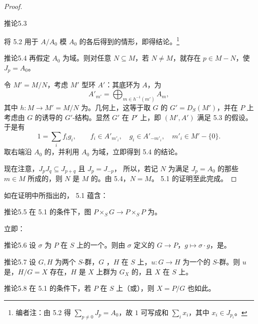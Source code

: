 \begin{proof}
\begin{SGAresult}{推论}{5.3}
\end{SGAresult}
将 5.2 用于 $A/A_0$ 模 $A_0$ 的各后得到的情形，即得结论。\footnote[20]{编者注：由 5.2 得 $\sum_{p\ne0}J_p=A_0$，故 $1$ 可写成和 $\sum_i x_i$，其中 $x_i\in J_{p_i}$。}
\begin{SGAresult}{推论}{5.4}
再假定 $A_0$ 为域。则对任意 $N\subseteq M$，若 $N\ne M$，就存在 $p\in M-N$，使 $J_p=A_0$。
\end{SGAresult}
令 $M'=M/N$，考虑 $M'$ 型环 $A'$：其底环为 $A$，为
\[
A'_{m'}=\bigoplus_{m\in h^{-1}(m')}A_m,
\]
其中 $h:M\to M'=M/N$ 为。几何上，这等于取 $G$ 的 $G'=D_S(M')$，并在 $P$ 上考虑由 $G$ 的诱导的 $G'$-结构。显然 $G'$ 在 $P'$ 上，即 $(M',A')$ 满足 5.3 的假设。于是有
\[
1=\sum_i f_ig_i,\qquad f_i\in A'_{m'_i},\quad g_i\in A'_{-m'_i},\quad m'_i\in M'-\{0\}.
\]
取右端沿 $A_0$ 的，并利用 $A_0$ 为域，立即得到 5.4 的结论。

现在注意，$J_pJ_q\subseteq J_{p+q}$ 且 $J_p=J_{-p}$，
所以，若记 $N$ 为满足 $J_p=A_0$ 的那些 $m\in M$ 所成的，则 $N$ 是 $M$ 的。由 5.4，$N=M$。 5.1 的证明至此完成。
\end{proof}
如在证明中所指出的， 5.1 蕴含：
\begin{SGAresult}{推论}{5.5}
在 5.1 的条件下，图 $P\times_SG\to P\times_SP$ 为。
\end{SGAresult}
立即：
\begin{SGAresult}{推论}{5.6}
设 $\sigma$ 为 $P$ 在 $S$ 上的一个。则由 $\sigma$ 定义的 $G\to P$，$g\mapsto\sigma\cdot g$，是。
\end{SGAresult}
\begin{SGAresult}{推论}{5.7}
设 $G,H$ 为两个 $S$-群，$G$ ，$H$ 在 $S$ 上，$u:G\to H$ 为一个的 $S$-群。则 $u$ 是，$H/G=X$ 存在，$H$ 是 $X$ 上群为 $G_X$ 的，且 $X$ 在 $S$ 上。
\end{SGAresult}
\begin{SGAresult}{推论}{5.8}
在 5.1 的条件下，若 $P$ 在 $S$ 上（或），则 $X=P/G$ 也如此。
\end{SGAresult}
